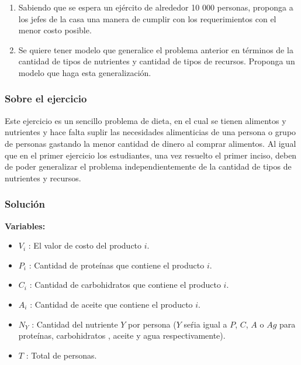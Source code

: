 \documentclass[a4paper,10pt,twocolumn]{article}
\theoremstyle{theorem}
\theoremstyle{definition}
\theoremstyle{remark}
\begin{document}
\renewcommand{\theenumi}{\alph{enumi}} %

\begin{enumerate}

	\item Sabiendo que se espera un ejército de alrededor 10 000 personas, proponga a los jefes de la casa una manera de cumplir con los 
	requerimientos con el menor costo posible.
	\item Se quiere tener modelo que generalice el problema anterior en términos de la cantidad de tipos de nutrientes y cantidad de tipos de 
	recursos. Proponga un modelo que haga esta generalización.

\end{enumerate}

		\subsubsection{Sobre el ejercicio}\label{subsubsec:sobre_ejer_2}

Este ejercicio es un sencillo problema de dieta, en el cual se tienen alimentos y nutrientes y hace falta suplir las necesidades alimenticias de una persona o grupo de personas gastando la menor cantidad de dinero al comprar alimentos. Al igual que en el primer ejercicio los estudiantes, una vez resuelto el primer inciso, deben de poder generalizar el problema independientemente de la cantidad de tipos de nutrientes y recursos.

		\subsubsection{Solución}\label{subsubsec:sol_ejer_2}

\textbf{Variables:}

\begin{itemize}

\item $V_{i}$ : El valor de costo del producto $i$.

\item $P_{i}$ : Cantidad de prote\'inas que contiene el producto $i$.

\item $C_{i}$ : Cantidad de carbohidratos que contiene el producto $i$.

\item $A_{i}$ : Cantidad de aceite que contiene el producto $i$.

\item $N_{Y}$ : Cantidad del nutriente $Y$ por persona ($Y$ se\'ria igual a $P$, $C$, $A$ o $Ag$ para prote\'inas, carbohidratos , aceite y agua respectivamente).

\item $T$ : Total de personas.

\end{itemize}
\end{document}
